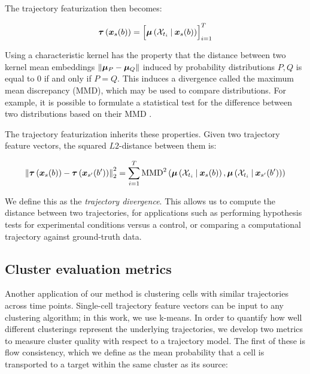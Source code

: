 The trajectory featurization then becomes:

\begin{equation}
    \bm{\tau}\left(\bm{x}_{s}(b)\right) = \Bigl[\bm{\mu}\left(\mathcal{X}_{t_i} \:\vert\: \bm{x}_{s}(b)\right)\Bigr]_{i=1}^T
\end{equation}

Using a characteristic kernel has the property that the distance between two kernel mean embeddings $\|\bm{\mu}_P - \bm{\mu}_Q\|$ induced by probability distributions $P, Q$ is equal to 0 if and only if $P=Q$. This induces a divergence called the maximum mean discrepancy (MMD), which may be used to compare distributions. For example, it is possible to formulate a statistical test for the difference between two distributions based on their MMD \citep{grettonKernelTwoSampleTest2012}.

The trajectory featurization inherits these properties. Given two trajectory feature vectors, the squared $L2$-distance between them is:

\begin{equation}
    \left\| \bm{\tau}\left(\bm{x}_{s}(b)\right) - \bm{\tau}\left(\bm{x}_{s'}(b')\right) \right\|_2^2 = \sum_{i=1}^T \operatorname{MMD}^2 \left( \bm{\mu}\left(\mathcal{X}_{t_i} \:\vert\: \bm{x}_{s}(b)\right), \bm{\mu}\left(\mathcal{X}_{t_i} \:\vert\: \bm{x}_{s'}(b')\right) \right)
\end{equation}

We define this as the \textit{trajectory divergence}. This allows us to compute the distance between two trajectories, for applications such as performing hypothesis tests for experimental conditions versus a control, or comparing a computational trajectory against ground-truth data.

\subsection{Cluster evaluation metrics}

Another application of our method is clustering cells with similar trajectories across time points. Single-cell trajectory feature vectors can be input to any clustering algorithm; in this work, we use k-means. In order to quantify how well different clusterings represent the underlying trajectories, we develop two metrics to measure cluster quality with respect to a trajectory model. The first of these is flow consistency, which we define as the mean probability that a cell is transported to a target within the same cluster as its source:

